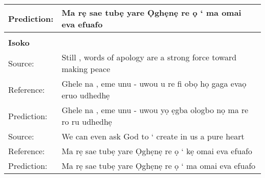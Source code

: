 \documentclass{article} %
\begin{document}
\begin{table}[h]
\begin{center}
\begin{tabular}{ll}
	 Prediction: & Ma rẹ sae tubẹ yare Ọghẹnẹ re ọ ‘ ma omai eva efuafo \\ 
	\bottomrule
     \\
     \textbf{Isoko}  & \\
    \bottomrule
    \bottomrule
	 Source: &    Still , words of apology are a strong force toward making peace \\
	 Reference: & Ghele na , eme unu - uwou u re fi obọ họ gaga evaọ eruo udhedhẹ \\
	 Prediction: & Ghele na , eme unu - uwou yọ ẹgba ologbo nọ ma re ro ru udhedhẹ \\
  \midrule
	 Source:  &   We can even ask God to ‘ create in us a pure heart \\
	 Reference: &  Ma rẹ sae tubẹ yare Ọghẹnẹ re ọ ‘ kẹ omai eva efuafo \\
	 Prediction: & Ma rẹ sae tubẹ yare Ọghẹnẹ re ọ ‘ ma omai eva efuafo \\ 
	\bottomrule

  \end{tabular}
\end{center}
\end{table}
\end{document}
